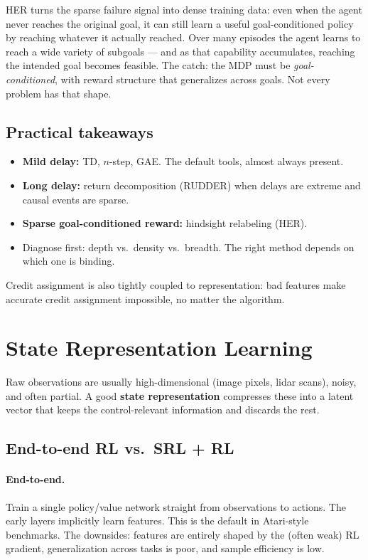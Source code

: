 \documentclass[11pt, oneside]{book}
\begin{document}
\begin{intbox}
HER turns the sparse failure signal into dense training data: even when the agent
never reaches the original goal, it can still learn a useful goal-conditioned policy
by reaching whatever it actually reached. Over many episodes the agent learns to
reach a wide variety of subgoals --- and as that capability accumulates, reaching the
intended goal becomes feasible.
The catch: the MDP must be \emph{goal-conditioned}, with reward structure that
generalizes across goals. Not every problem has that shape.
\end{intbox}

\subsection{Practical takeaways}

\begin{itemize}
  \item \textbf{Mild delay:} TD, $n$-step, GAE. The default tools, almost always present.
  \item \textbf{Long delay:} return decomposition (RUDDER) when delays are extreme and
    causal events are sparse.
  \item \textbf{Sparse goal-conditioned reward:} hindsight relabeling (HER).
  \item Diagnose first: depth vs.\ density vs.\ breadth. The right method depends on
    which one is binding.
\end{itemize}
Credit assignment is also tightly coupled to representation: bad features make accurate
credit assignment impossible, no matter the algorithm.

\section{State Representation Learning}

Raw observations are usually high-dimensional (image pixels, lidar scans), noisy, and
often partial.
A good \textbf{state representation} compresses these into a latent vector that keeps
the control-relevant information and discards the rest.

\subsection{End-to-end RL vs.\ SRL + RL}

\paragraph{End-to-end.}
Train a single policy/value network straight from observations to actions. The early
layers implicitly learn features. This is the default in Atari-style benchmarks.
The downsides: features are entirely shaped by the (often weak) RL gradient, generalization
across tasks is poor, and sample efficiency is low.
\end{document}
